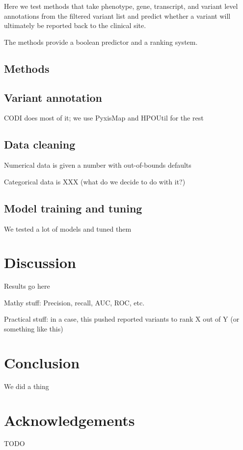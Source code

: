 \documentclass{bioinfo}
\begin{document}
Here we test methods that take phenotype, gene, transcript, and variant level annotations from the filtered variant list and predict whether a variant will ultimately be reported back to the clinical site.

The methods provide a boolean predictor and a ranking system.

\begin{methods}
\section{Methods}

\subsection{Variant annotation}
CODI does most of it; we use PyxisMap and HPOUtil for the rest

\subsection{Data cleaning}
Numerical data is given a number with out-of-bounds defaults

Categorical data is XXX (what do we decide to do with it?)

\subsection{Model training and tuning}

We tested a lot of models and tuned them

\end{methods}

\section{Discussion}
Results go here

Mathy stuff: Precision, recall, AUC, ROC, etc.

Practical stuff: in a case, this pushed reported variants to rank X out of Y (or something like this)

\section{Conclusion}

We did a thing

\section*{Acknowledgements}
TODO
\end{document}
